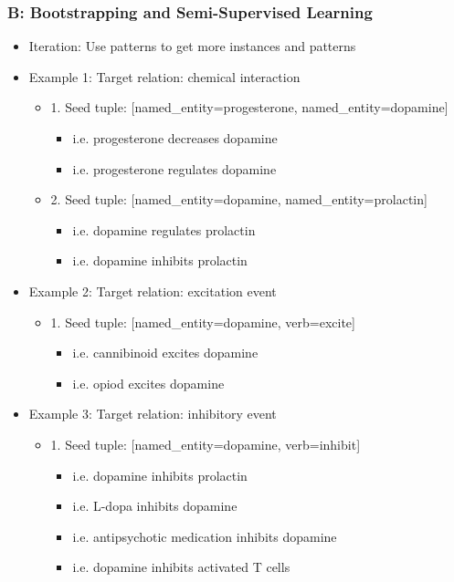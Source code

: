 \documentclass[11pt]{article}
\begin{document}
\begin{itemize}
\subsubsection*{B:  Bootstrapping and Semi-Supervised Learning}
\begin{itemize}
\item Iteration: Use patterns to get more instances and patterns 
\item Example 1: Target relation: chemical interaction
	\begin{itemize}
	\item 	1. Seed tuple: [named\_entity=progesterone, named\_entity=dopamine]
		\begin{itemize}
		\item 	i.e. progesterone decreases dopamine 
		\item 	i.e. progesterone regulates dopamine
		\end{itemize}
	\item 	2. Seed tuple: [named\_entity=dopamine, named\_entity=prolactin]
		\begin{itemize}
		\item 	i.e. dopamine regulates prolactin 
		\item 	i.e. dopamine inhibits prolactin
		\end{itemize}
	\end{itemize}
\item Example 2: Target relation: excitation event
	\begin{itemize}
	\item 1.	Seed tuple: [named\_entity=dopamine, verb=excite]
		\begin{itemize}
		\item 	i.e. cannibinoid excites dopamine
		\item	i.e. opiod excites dopamine
		\end{itemize}
	\end{itemize}
\item Example 3: Target relation: inhibitory event
	\begin{itemize}
	\item 1.	Seed tuple: [named\_entity=dopamine, verb=inhibit]
		\begin{itemize}
		\item 	i.e. dopamine inhibits prolactin
		\item	i.e. L-dopa inhibits dopamine
		\item 	i.e. antipsychotic medication inhibits dopamine
		\item 	i.e. dopamine inhibits activated T cells
		\end{itemize}			


\end{itemize}
\end{itemize}
\end{itemize}
\end{document}
